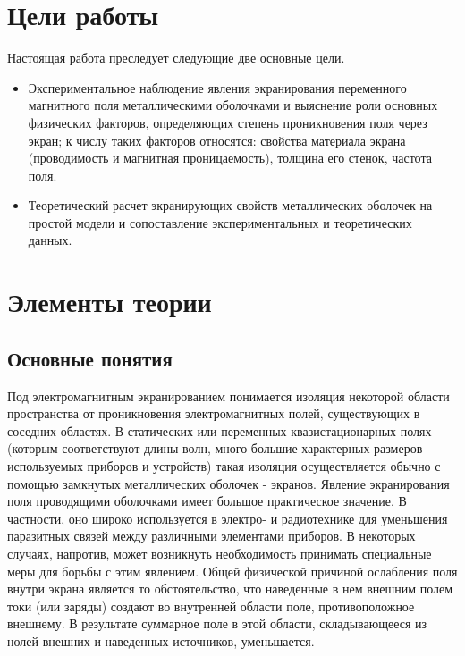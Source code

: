 
	\def\authors{Есюнин М.В., Есюнин Д.В.}
	\def\labname{Электромагнитное экранирование}
	\def\sciadviser{Павличенко И.А.}
	\def\shortlabname{Электромагнитное экранирование}
\usepackage{float}



\renewcommand{\phi}{\varphi}
\renewcommand{\hat}{\widehat}

\tableofcontents

\newpage
\sloppy

\section{Цели работы}
Настоящая работа преследует следующие две основные цели.
\begin{itemize}
	\item Экспериментальное наблюдение явления экранирования переменного магнитного поля металлическими оболочками и выяснение роли основных физических факторов, определяющих степень проникновения поля через экран; к числу таких факторов относятся: свойства материала экрана (проводимость и магнитная проницаемость), толщина его стенок, частота поля.
	\item Теоретический расчет экранирующих свойств металлических оболочек на простой модели и сопоставление экспериментальных и теоретических данных.
\end{itemize}
\section{Элементы теории}
\subsection{Основные понятия}
Под электромагнитным экранированием понимается изоляция некоторой области пространства от проникновения электромагнитных полей, существующих в соседних областях. В статических или переменных квазистационарных полях (которым соответствуют длины волн, много большие характерных размеров используемых приборов и устройств) такая изоляция осуществляется обычно с помощью замкнутых металлических оболочек - экранов. Явление экранирования поля проводящими оболочками имеет большое практическое значение. В частности, оно широко используется в электро- и радиотехнике для уменьшения паразитных связей между различными элементами приборов. В некоторых случаях, напротив, может возникнуть необходимость принимать специальные меры для борьбы с этим явлением.
Общей физической причиной ослабления поля внутри 
экрана является то обстоятельство, что наведенные в нем внешним полем токи (или заряды) создают во внутренней области поле, противоположное внешнему. В результате суммарное поле в этой области, складывающееся из нолей внешних и наведенных источников, уменьшается.

